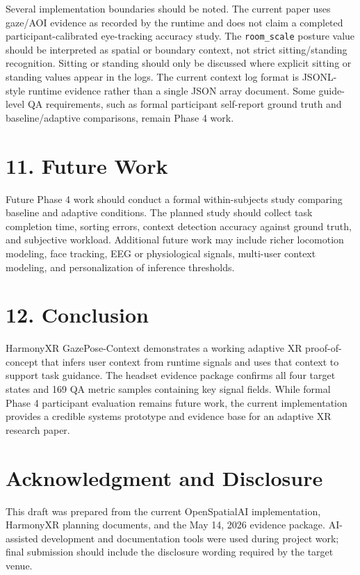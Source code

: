 \documentclass[
  10pt,
]{article}
\begin{document}
Several implementation boundaries should be noted. The current paper
uses gaze/AOI evidence as recorded by the runtime and does not claim a
completed participant-calibrated eye-tracking accuracy study. The
\texttt{room\_scale} posture value should be interpreted as spatial or
boundary context, not strict sitting/standing recognition. Sitting or
standing should only be discussed where explicit sitting or standing
values appear in the logs. The current context log format is JSONL-style
runtime evidence rather than a single JSON array document. Some
guide-level QA requirements, such as formal participant self-report
ground truth and baseline/adaptive comparisons, remain Phase 4 work.

\section{11. Future Work}\label{future-work}

Future Phase 4 work should conduct a formal within-subjects study
comparing baseline and adaptive conditions. The planned study should
collect task completion time, sorting errors, context detection accuracy
against ground truth, and subjective workload. Additional future work
may include richer locomotion modeling, face tracking, EEG or
physiological signals, multi-user context modeling, and personalization
of inference thresholds.

\section{12. Conclusion}\label{conclusion}

HarmonyXR GazePose-Context demonstrates a working adaptive XR
proof-of-concept that infers user context from runtime signals and uses
that context to support task guidance. The headset evidence package
confirms all four target states and 169 QA metric samples containing key
signal fields. While formal Phase 4 participant evaluation remains
future work, the current implementation provides a credible systems
prototype and evidence base for an adaptive XR research paper.

\section{Acknowledgment and
Disclosure}\label{acknowledgment-and-disclosure}

This draft was prepared from the current OpenSpatialAI implementation,
HarmonyXR planning documents, and the May 14, 2026 evidence package.
AI-assisted development and documentation tools were used during project
work; final submission should include the disclosure wording required by
the target venue.
\end{document}
